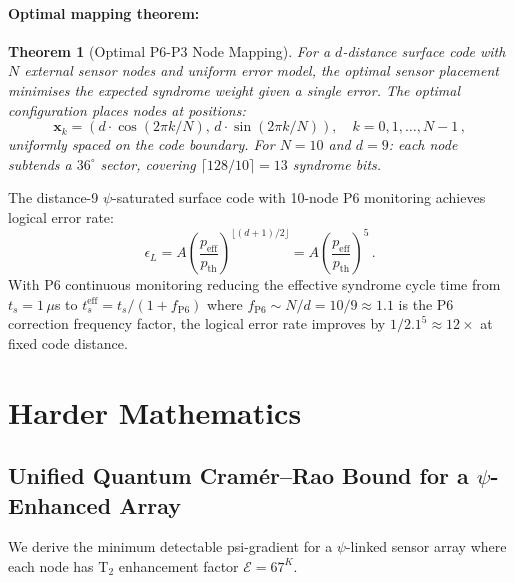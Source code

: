 \documentclass[11pt]{article}
\newtheorem{theorem}{Theorem}[section]
\theoremstyle{definition}
\theoremstyle{remark}
\begin{document}
\paragraph{Optimal mapping theorem:}
\begin{theorem}[Optimal P6-P3 Node Mapping]
\label{thm:p6-p3-map}
For a $d$-distance surface code with $N$ external sensor nodes and uniform
error model, the optimal sensor placement minimises the expected syndrome
weight given a single error. The optimal configuration places nodes at
positions:
\begin{equation}
\mathbf{x}_k = (d\cdot\cos(2\pi k / N),\, d\cdot\sin(2\pi k / N)),
\quad k = 0, 1, \ldots, N-1\,,
\end{equation}
uniformly spaced on the code boundary. For $N = 10$ and $d = 9$:
each node subtends a $36^\circ$ sector, covering $\lceil 128/10 \rceil = 13$
syndrome bits.
\end{theorem}

The distance-9 $\psi$-saturated surface code with 10-node P6 monitoring
achieves logical error rate:
\begin{equation}
\epsilon_L = A \left(\frac{p_{\mathrm{eff}}}{p_{\mathrm{th}}}\right)^{\lfloor
(d+1)/2\rfloor} = A \left(\frac{p_{\mathrm{eff}}}{p_{\mathrm{th}}}\right)^{5}\,.
\end{equation}
With P6 continuous monitoring reducing the effective syndrome cycle time from
$t_s = 1\,\mu$s to $t_s^{\mathrm{eff}} = t_s / (1 + f_{\mathrm{P6}})$ where
$f_{\mathrm{P6}} \sim N/d = 10/9 \approx 1.1$ is the P6 correction frequency
factor, the logical error rate improves by $1/2.1^5 \approx 12\times$ at
fixed code distance.

\section{Harder Mathematics}
\label{sec:harder-math}

\subsection{Unified Quantum Cramér--Rao Bound for a $\psi$-Enhanced Array}
\label{sec:unified-qcrb}

We derive the minimum detectable psi-gradient for a $\psi$-linked sensor array
where each node has T$_2$ enhancement factor $\mathcal{E} = 67^K$.
\end{document}
